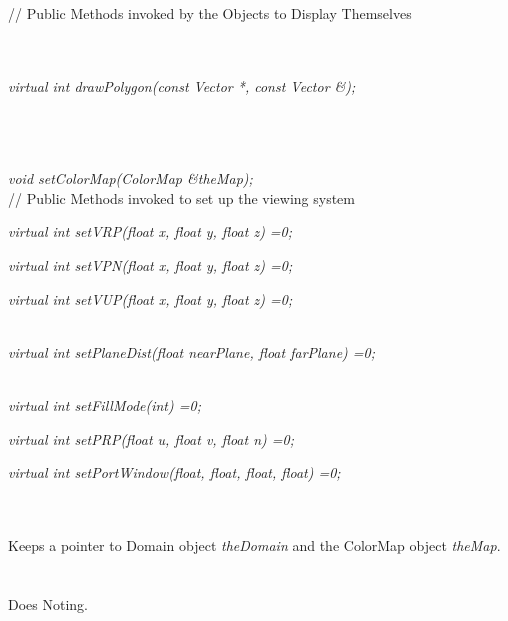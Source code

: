 // Public Methods invoked by the Objects to Display Themselves

\\
\\
{\em virtual int drawPolygon(const Vector *, const Vector \&);} 

\\
\\
\\
{\em void setColorMap(ColorMap \&theMap);}\\ 

// Public Methods invoked to set up the viewing system 

{\em virtual int setVRP(float x, float y, float z) =0;}

{\em virtual int setVPN(float x, float y, float z) =0;}

{\em virtual int setVUP(float x, float y, float z) =0;}

\\
{\em    virtual int setPlaneDist(float nearPlane, float farPlane) =0;}

\\ 
{\em    virtual int setFillMode(int) =0;}

{\em    virtual int setPRP(float u, float v, float n) =0;}

{\em    virtual int setPortWindow(float, float, float, float) =0;}



 \\ 
\\ 
Keeps a pointer to Domain object {\em theDomain} and the ColorMap
object {\em theMap}. \\

 \\
\\  
Does Noting. \\

